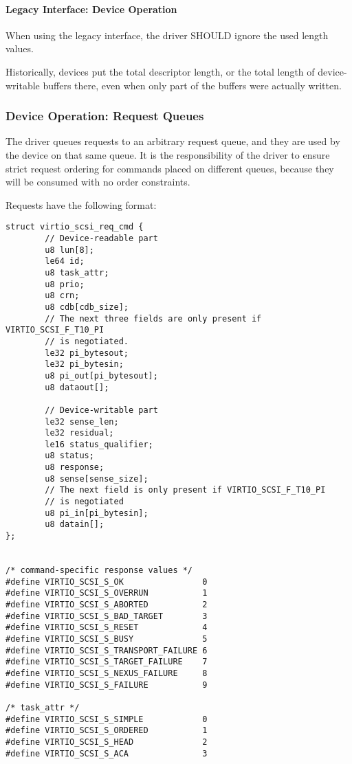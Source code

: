 \paragraph{Legacy Interface: Device Operation}\label{sec:Device
Types / SCSI Host Device / Device Operation / Legacy
Interface: Device Operation}
When using the legacy interface, the driver SHOULD ignore the
used length values.
\begin{note}
Historically, devices put the total descriptor length,
or the total length of device-writable buffers there,
even when only part of the buffers were actually written.
\end{note}

\subsubsection{Device Operation: Request Queues}\label{sec:Device Types / SCSI Host Device / Device Operation / Device Operation: Request Queues}

The driver queues requests to an arbitrary request queue, and
they are used by the device on that same queue. It is the
responsibility of the driver to ensure strict request ordering
for commands placed on different queues, because they will be
consumed with no order constraints.

Requests have the following format:

\begin{lstlisting}
struct virtio_scsi_req_cmd {
        // Device-readable part
        u8 lun[8];
        le64 id;
        u8 task_attr;
        u8 prio;
        u8 crn;
        u8 cdb[cdb_size];
        // The next three fields are only present if VIRTIO_SCSI_F_T10_PI
        // is negotiated.
        le32 pi_bytesout;
        le32 pi_bytesin;
        u8 pi_out[pi_bytesout];
        u8 dataout[];

        // Device-writable part
        le32 sense_len;
        le32 residual;
        le16 status_qualifier;
        u8 status;
        u8 response;
        u8 sense[sense_size];
        // The next field is only present if VIRTIO_SCSI_F_T10_PI
        // is negotiated
        u8 pi_in[pi_bytesin];
        u8 datain[];
};


/* command-specific response values */
#define VIRTIO_SCSI_S_OK                0
#define VIRTIO_SCSI_S_OVERRUN           1
#define VIRTIO_SCSI_S_ABORTED           2
#define VIRTIO_SCSI_S_BAD_TARGET        3
#define VIRTIO_SCSI_S_RESET             4
#define VIRTIO_SCSI_S_BUSY              5
#define VIRTIO_SCSI_S_TRANSPORT_FAILURE 6
#define VIRTIO_SCSI_S_TARGET_FAILURE    7
#define VIRTIO_SCSI_S_NEXUS_FAILURE     8
#define VIRTIO_SCSI_S_FAILURE           9

/* task_attr */
#define VIRTIO_SCSI_S_SIMPLE            0
#define VIRTIO_SCSI_S_ORDERED           1
#define VIRTIO_SCSI_S_HEAD              2
#define VIRTIO_SCSI_S_ACA               3
\end{lstlisting}

